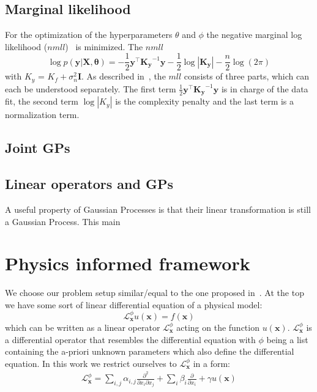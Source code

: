 \documentclass{article}
\begin{document}
\subsection{Marginal likelihood}

For the optimization of the hyperparameters $\theta$ and $\phi$ the negative
marginal log likelihood ($nmll$)~\cite{RasmussenCarlEdward} is minimized. The
$nmll$
\begin{equation}
    \label{eq:nmll}
    \log p(\bm{y}|\bm{X},\bm{\theta}) = -\frac{1}{2}\bm{y}^\intercal \bm{K_y}^{-1}\bm{y} - \frac{1}{2}\log\left\lvert \bm{K_y}\right\rvert - \frac{n}{2}\log(2\pi)
\end{equation}
with $K_y$ = $K_f + \sigma_n^2 \bm{I}$. As described in~\cite{RasmussenCarlEdward}, the $mll$ consists of three parts, which can each be understood separately. The first term $\frac{1}{2}\bm{y}^\intercal \bm{K_y}^{-1}\bm{y}$ is in charge of the data fit, the second term $\log\left\lvert K_y\right\rvert$ is the complexity penalty and the last term is a normalization term.

\subsection{Joint GPs}

\subsection{Linear operators and GPs}
A useful property of Gaussian Processes is that their linear transformation is
still a Gaussian Process. This main

\section{Physics informed framework}
We choose our problem setup similar/equal to the one proposed in~\cite{RAISSI}. At the top we 
have some sort of linear differential equation of a physical model:
\begin{equation}
    \label{eq:Lu=f}
    \mathcal{L}_{\bm{x}}^\phi u(\bm{x}) = f(\bm{x})
\end{equation}
which can be written as a linear operator $\mathcal{L}_{\bm{x}}^\phi$ acting on the function $u(\bm{x})$. $\mathcal{L}_{\bm{x}}^\phi$ is a differential operator that resembles the differential equation with $\phi$ being a list containing the a-priori unknown parameters which also define the differential equation. In this work we restrict ourselves to $\mathcal{L}_{\bm{x}}^\phi$ in a form:
\begin{align}
\mathcal{L}_{\bm{x}}^\phi = \sum_{i,j} \alpha_{i,j} \frac{\partial^2 }{\partial x_i \partial x_j} + \sum_{i} \beta_i \frac{\partial}{\partial x_i} + \gamma u(\bm{x})
\end{align}
\end{document}
